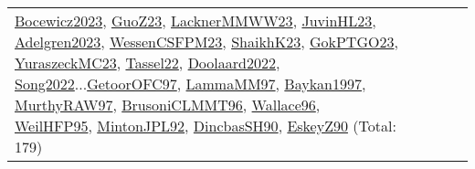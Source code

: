 {\begin{longtable}{p{3cm}r>{\raggedright\arraybackslash}p{6cm}>{\raggedright\arraybackslash}p{6cm}>{\raggedright\arraybackslash}p{8cm}}
\hyperref[detail:Bocewicz2023]{Bocewicz2023}, \hyperref[detail:GuoZ23]{GuoZ23}, \hyperref[detail:LacknerMMWW23]{LacknerMMWW23}, \hyperref[detail:JuvinHL23]{JuvinHL23}, \hyperref[detail:Adelgren2023]{Adelgren2023}, \hyperref[detail:WessenCSFPM23]{WessenCSFPM23}, \hyperref[detail:ShaikhK23]{ShaikhK23}, \hyperref[detail:GokPTGO23]{GokPTGO23}, \hyperref[detail:YuraszeckMC23]{YuraszeckMC23}, \hyperref[detail:Tassel22]{Tassel22}, \hyperref[detail:Doolaard2022]{Doolaard2022}, \hyperref[detail:Song2022]{Song2022}...\hyperref[detail:GetoorOFC97]{GetoorOFC97}, \hyperref[detail:LammaMM97]{LammaMM97}, \hyperref[detail:Baykan1997]{Baykan1997}, \hyperref[detail:MurthyRAW97]{MurthyRAW97}, \hyperref[detail:BrusoniCLMMT96]{BrusoniCLMMT96}, \hyperref[detail:Wallace96]{Wallace96}, \hyperref[detail:WeilHFP95]{WeilHFP95}, \hyperref[detail:MintonJPL92]{MintonJPL92}, \hyperref[detail:DincbasSH90]{DincbasSH90}, \hyperref[detail:EskeyZ90]{EskeyZ90} (Total: 179)\\

\end{longtable}}
